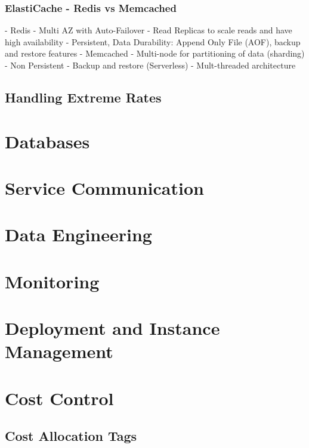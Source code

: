 \documentclass[11pt]{book}
\begin{document}
    \subsection{ElastiCache - Redis vs Memcached}
    - Redis
    - Multi AZ with Auto-Failover
    - Read Replicas to scale reads and have high availability
    - Persistent, Data Durability: Append Only File (AOF), backup and restore features
    - Memcached
    - Multi-node for partitioning of data (sharding)
    - Non Persistent
    - Backup and restore (Serverless)
    - Mult-threaded architecture


    \section{Handling Extreme Rates}


    \chapter{Databases}


    \chapter{Service Communication}


    \chapter{Data Engineering}


    \chapter{Monitoring}


    \chapter{Deployment and Instance Management}


    \chapter{Cost Control}


    \section{Cost Allocation Tags}
\end{document}
